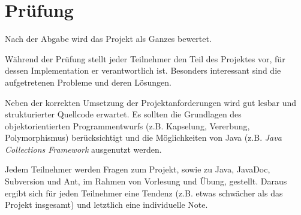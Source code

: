 \section*{Prüfung}
Nach der Abgabe wird das Projekt als Ganzes bewertet.

Während der Prüfung stellt jeder Teilnehmer den Teil des Projektes vor, für dessen Implementation er verantwortlich ist. Besonders interessant sind die aufgetretenen Probleme und deren Lösungen.

Neben der korrekten Umsetzung der Projektanforderungen wird gut lesbar und strukturierter Quellcode erwartet. Es sollten die Grundlagen des objektorientierten Programmentwurfs (z.B. Kapselung, Vererbung, Polymorphismus) berücksichtigt und die Möglichkeiten von Java (z.B. \emph{Java Collections Framework} ausgenutzt werden.

Jedem Teilnehmer werden Fragen zum Projekt, sowie zu Java, JavaDoc, Subversion und Ant, im Rahmen von Vorlesung und Übung, gestellt. Daraus ergibt sich für jeden Teilnehmer eine Tendenz (z.B. etwas schwächer als das Projekt insgesamt) und letztlich eine individuelle Note.